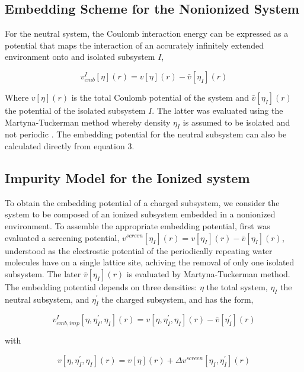 \documentclass[12pt,a4paper]{article}
\begin{document}
\subsection{Embedding Scheme for the Nonionized System}

For the neutral system, the Coulomb interaction energy can be expressed as a potential that maps the interaction of an accurately infinitely extended
environment onto and isolated subsystem $I$,

\begin{equation}
	v^{I}_{emb} [\eta] (r) = v[\eta](r) - \bar{v} [\eta_I](r)
\end{equation}

Where $v[\eta](r)$ is the total Coulomb potential of the system and $\bar{v} [\eta_I](r)$ the potential of the isolated subsystem $I$. The latter was
evaluated using the Martyna-Tuckerman method whereby density $\eta_I$ is assumed to be isolated and not periodic \cite{martyna1999reciprocal}.
The embedding potential for the neutral subsystem can also be calculated directly from equation $3$.

\subsection{Impurity Model for the Ionized system}

To obtain the embedding potential of a charged subsystem, we consider the system to be composed of an ionized subsystem embedded in a nonionized
environment. To assemble the appropriate embedding potential, first was evaluated a screening potential, 
$v^{screen}[\eta_I](r) = v[\eta_I](r) - \bar{v} [\eta_I](r)$, understood as the electrostic potential of the periodically repeating water
molecules have on a single lattice site, achiving the removal of only one isolated subsystem. The later $\bar{v} [\eta_I](r)$ is evaluated by
Martyna-Tuckerman method\cite{martyna1999reciprocal}. The embedding potential depends on three densities: $\eta$ the total system,
$\eta_I$ the neutral subsystem, and $\eta^{'}_I$ the charged subsystem, and has the form,

\begin{equation}
	v^I_{emb,imp}[\eta, \eta^{'}_I, \eta_I](r) = v[\eta, \eta^{'}_I, \eta_I](r) - \bar{v}[\eta^{'}_I](r)
\end{equation}

with

\begin{equation}
	v[\eta, \eta^{'}_I, \eta_I](r) = v[\eta](r) + \Delta{v}^{screen}[\eta_I, \eta^{'}_I](r)
\end{equation}
\end{document}
